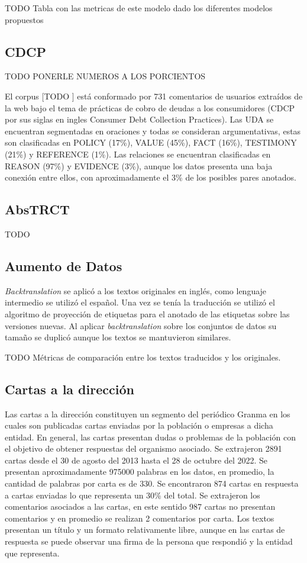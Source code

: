 TODO Tabla con las metricas de este modelo dado los diferentes modelos propuestos

\subsection{CDCP}\label{corpus:cdcp}

TODO PONERLE NUMEROS A LOS PORCIENTOS

El corpus [TODO \cite{CORPUS PAPER}] está conformado por 731 comentarios de usuarios extraídos de la web bajo el tema de 
prácticas de cobro de deudas a los consumidores (CDCP por sus siglas en ingles Consumer Debt Collection Practices).
Las UDA se encuentran segmentadas en oraciones y todas se consideran argumentativas, estas son clasificadas en 
POLICY (17\%), VALUE (45\%), FACT (16\%), TESTIMONY (21\%) y REFERENCE (1\%). Las relaciones se encuentran 
clasificadas en REASON (97\%) y EVIDENCE (3\%), aunque los datos presenta una baja conexión entre ellos, con 
aproximadamente el 3\% de los posibles pares anotados.

\subsection{AbsTRCT}

TODO 

\subsection{Aumento de Datos}

\emph{Backtranslation} se aplicó a los textos originales en inglés, como lenguaje intermedio se utilizó el español.
Una vez se tenía la traducción se utilizó el algoritmo de proyección de etiquetas para el anotado de las etiquetas sobre
las versiones nuevas.
Al aplicar \emph{backtranslation} sobre los conjuntos de datos su tamaño se duplicó aunque los textos se mantuvieron
similares. 

TODO Métricas de comparación entre los textos traducidos y los originales.

\subsection{Cartas a la dirección}

Las cartas a la dirección constituyen un segmento del periódico Granma en los cuales son publicadas
cartas enviadas por la población o empresas a dicha entidad. En general, las cartas 
presentan dudas o problemas de la población con el objetivo de obtener respuestas del organismo
asociado. Se extrajeron 2891 cartas desde el 30 de agosto del 2013 hasta el 28 de octubre del 2022. Se 
presentan aproximadamente 975000 palabras en los datos, en promedio, la cantidad de palabras por carta es de 330.
Se encontraron 874 cartas en respuesta a cartas enviadas lo que representa un 30\% del total. Se extrajeron
los comentarios asociados a las cartas, en este sentido 987 cartas no presentan comentarios y en promedio 
se realizan 2 comentarios por carta. Los textos presentan un título y un formato relativamente libre, 
aunque en las cartas de respuesta se puede observar una firma de la persona que respondió y la entidad que 
representa.

